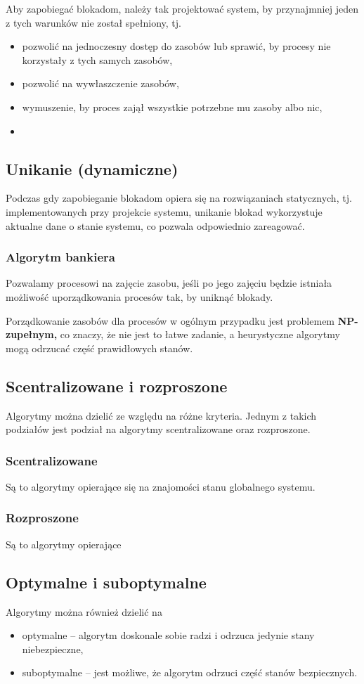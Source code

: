 Aby zapobiegać blokadom, należy tak projektować system, by przynajmniej jeden z tych warunków nie został spełniony, tj.

\begin{itemize}
	\item{pozwolić na jednoczesny dostęp do zasobów lub sprawić, by procesy nie korzystały z tych samych zasobów,}
	\item{pozwolić na wywłaszczenie zasobów,}
	\item{wymuszenie, by proces zajął wszystkie potrzebne mu zasoby albo nic,}
	\item{}
\end{itemize}

\subsection{Unikanie (dynamiczne)}
Podczas gdy zapobieganie blokadom opiera się na rozwiązaniach statycznych, tj. implementowanych przy projekcie systemu, unikanie blokad wykorzystuje aktualne dane o stanie systemu, co pozwala odpowiednio zareagować.

\subsubsection{Algorytm bankiera}
Pozwalamy procesowi na zajęcie zasobu, jeśli po jego zajęciu będzie istniała możliwość uporządkowania procesów tak, by uniknąć blokady.

Porządkowanie zasobów dla procesów w ogólnym przypadku jest problemem \textbf{NP-zupełnym,} co znaczy, że nie jest to łatwe zadanie, a heurystyczne algorytmy mogą odrzucać część prawidłowych stanów.

\subsection{Scentralizowane i rozproszone}
Algorytmy można dzielić ze względu na różne kryteria.
Jednym z takich podziałów jest podział na algorytmy scentralizowane oraz rozproszone.

\subsubsection{Scentralizowane}
Są to algorytmy opierające się na znajomości stanu globalnego systemu.
\subsubsection{Rozproszone}
Są to algorytmy opierające 

\subsection{Optymalne i suboptymalne}
Algorytmy można również dzielić na
\begin{itemize}
	\item{optymalne -- algorytm doskonale sobie radzi i odrzuca jedynie stany niebezpieczne,}
	\item{suboptymalne -- jest możliwe, że algorytm odrzuci część stanów bezpiecznych.}
\end{itemize}

